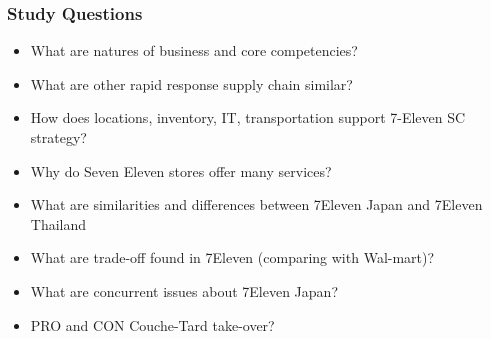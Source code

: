 \documentclass[10pt,handout,notes=show]{beamer}
\begin{document}
\begin{frame}
  \frametitle{Study Questions}

  \begin{itemize}
    \item What are natures of business and core competencies?
    \item What are other rapid response supply chain similar?
    \item How does locations, inventory, IT, transportation support 7-Eleven SC strategy?
    \item Why do Seven Eleven stores offer many services?
    \item What are similarities and differences between 7Eleven Japan and 7Eleven Thailand
    \item What are \alert{trade-off} found in 7Eleven (comparing with Wal-mart)?
    \item<2-> What are concurrent issues about 7Eleven Japan? \hfill {}
    \item<2-> PRO and CON \alert{Couche-Tard} take-over? \hfill {}
  \end{itemize}


\end{frame}
\end{document}
